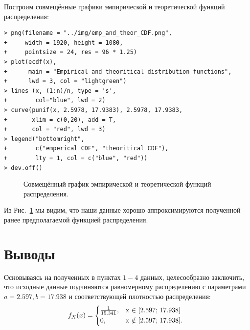 \documentclass[14pt,a4paper]{scrartcl}
\begin{document}
Построим совмещённые графики эмпирической и теоретической функций распределения:
\begin{lstlisting}
> png(filename = "../img/emp_and_theor_CDF.png", 
+     width = 1920, height = 1080,
+     pointsize = 24, res = 96 * 1.25)
> plot(ecdf(x), 
+      main = "Empirical and theoritical distribution functions", 
+      lwd = 3, col = "lightgreen")
> lines (x, (1:n)/n, type = 's', 
+        col="blue", lwd = 2)
> curve(punif(x, 2.5978, 17.9383), 2.5978, 17.9383, 
+       xlim = c(0,20), add = T, 
+       col = "red", lwd = 3)
> legend("bottomright", 
+        c("emperical CDF", "theoritical CDF"), 
+        lty = 1, col = c("blue", "red"))
> dev.off()
\end{lstlisting}

\begin{figure}[h]
	\caption{Совмещённый график эмпирической и теоретической функций распределения.}
	\label{ris:emp_and_theor_CDF}
\end{figure}

Из Рис.~\ref{ris:emp_and_theor_CDF} мы видим, что наши данные хорошо аппроксимируются полученной ранее предполагаемой функцией распределения.

\section{Выводы}
Основываясь на полученных в пунктах $1-4$ данных, целесообразно заключить, что исходные данные подчиняются равномерному распределению с параметрами $a = 2.597, b = 17.938$ и соответствующей плотностью распределения:
\begin{equation*}
	f_X(x) = 
		\begin{cases*}
		\frac{1}{15.341}, & x $\in$ [2.597; 17.938]  \\
		0, & x $\notin$ [2.597; 17.938]. \\
	\end{cases*}
\end{equation*}
\end{document}
